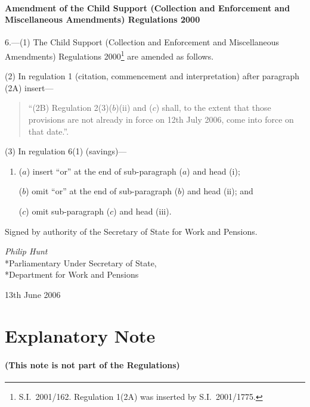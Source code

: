 \documentclass[12pt,a4paper]{article}
\begin{document}
\subsection[6. Amendment of the Child Support (Collection and Enforcement and Miscellaneous Amendments) Regulations 2000]{Amendment of the Child Support (Collection and Enforcement and Miscellaneous Amendments) Regulations 2000}

6.---(1)  The Child Support (Collection and Enforcement and Miscellaneous Amendments) Regulations 2000\footnote{S.I.\ 2001/162. Regulation 1(2A) was inserted by S.I.\ 2001/1775.} are amended as follows.

(2) In regulation 1 (citation, commencement and interpretation) after paragraph (2A) insert—
\begin{quotation}
“(2B) Regulation 2(3)($b$)(ii) and ($c$)  shall, to the extent that those provisions are not already in force on 12th July 2006, come into force on that date.”.
\end{quotation}

(3) In regulation 6(1) (savings)—
\begin{enumerate}\item[]
($a$) insert “or” at the end of sub-paragraph ($a$)  and head (i);

($b$) omit “or” at the end of sub-paragraph ($b$)  and head (ii); and

($c$) omit sub-paragraph ($c$)  and head (iii).
\end{enumerate}

\bigskip

Signed 
by authority of the 
Secretary of State for Work and Pensions.

{\raggedleft
\emph{Philip Hunt}\\*Parliamentary Under Secretary of State,\\*Department for Work and Pensions

}

13th June 2006

\small

\part{Explanatory Note}

\renewcommand\parthead{— Explanatory Note}

\subsection*{(This note is not part of the Regulations)}
\end{document}

